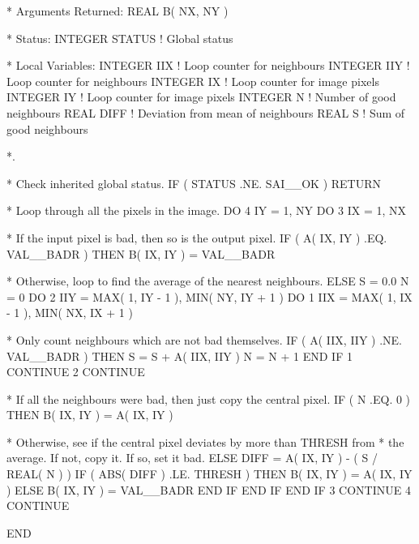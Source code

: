 \documentclass[twoside,11pt,nolof]{starlink}
\begin{document}
\begin{terminalv}
*  Arguments Returned:
      REAL B( NX, NY )

*  Status:
      INTEGER STATUS             ! Global status

*  Local Variables:
      INTEGER IIX                ! Loop counter for neighbours
      INTEGER IIY                ! Loop counter for neighbours
      INTEGER IX                 ! Loop counter for image pixels
      INTEGER IY                 ! Loop counter for image pixels
      INTEGER N                  ! Number of good neighbours
      REAL DIFF                  ! Deviation from mean of neighbours
      REAL S                     ! Sum of good neighbours

*.

*  Check inherited global status.
      IF ( STATUS .NE. SAI__OK ) RETURN

*  Loop through all the pixels in the image.
      DO 4 IY = 1, NY
         DO 3 IX = 1, NX

*  If the input pixel is bad, then so is the output pixel.
            IF ( A( IX, IY ) .EQ. VAL__BADR ) THEN
               B( IX, IY ) = VAL__BADR

*  Otherwise, loop to find the average of the nearest neighbours.
            ELSE
               S = 0.0
               N = 0
               DO 2 IIY = MAX( 1, IY - 1 ), MIN( NY, IY + 1 )
                  DO 1 IIX = MAX( 1, IX - 1 ), MIN( NX, IX + 1 )

*  Only count neighbours which are not bad themselves.
                     IF ( A( IIX, IIY ) .NE. VAL__BADR ) THEN
                        S = S + A( IIX, IIY )
                        N = N + 1
                     END IF
 1                CONTINUE
 2             CONTINUE

*  If all the neighbours were bad, then just copy the central pixel.
               IF ( N .EQ. 0 ) THEN
                  B( IX, IY ) = A( IX, IY )

*  Otherwise, see if the central pixel deviates by more than THRESH from
*  the average. If not, copy it. If so, set it bad.
               ELSE
                  DIFF = A( IX, IY ) - ( S / REAL( N ) )
                  IF ( ABS( DIFF ) .LE. THRESH ) THEN
                     B( IX, IY ) = A( IX, IY )
                  ELSE
                     B( IX, IY ) = VAL__BADR
                  END IF
               END IF
            END IF
 3       CONTINUE
 4    CONTINUE

      END
\end{terminalv}
\normalsize
\end{document}
